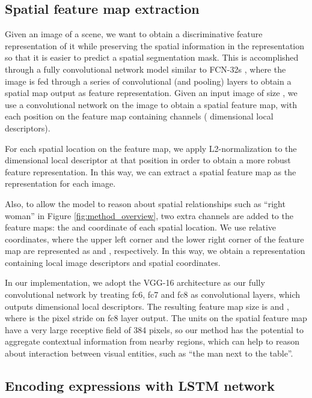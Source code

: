 \documentclass[runningheads]{llncs}
\begin{document}
\subsection{Spatial feature map extraction}\label{sec:encode_image}

Given an image of a scene, we want to obtain a discriminative feature representation of it while preserving the spatial information in the representation so that it is easier to predict a spatial segmentation mask. This is accomplished through a fully convolutional network model similar to FCN-32s \cite{long2015fully}, where the image is fed through a series of convolutional (and pooling) layers to obtain a spatial map output as feature representation. Given an input image of size , we use a convolutional network on the image to obtain a  spatial feature map, with each position on the feature map containing  channels ( dimensional local descriptors).

For each spatial location on the feature map, we apply L2-normalization to the  dimensional local descriptor at that position in order to obtain a more robust feature representation. In this way, we can extract a  spatial feature map as the representation for each image.

Also, to allow the model to reason about spatial relationships such as ``right woman'' in Figure \ref{fig:method_overview}, two extra channels are added to the feature maps: the  and  coordinate of each spatial location. We use relative coordinates, where the upper left corner and the lower right corner of the feature map are represented as  and , respectively. In this way, we obtain a  representation containing local image descriptors and spatial coordinates.

In our implementation, we adopt the VGG-16 architecture \cite{simonyan2014very} as our fully convolutional network by treating fc6, fc7 and fc8 as convolutional layers, which outputs  dimensional local descriptors. The resulting feature map size is  and , where  is the pixel stride on fc8 layer output. The units on the spatial feature map have a very large receptive field of 384 pixels, so our method has the potential to aggregate contextual information from nearby regions, which can help to reason about interaction between visual entities, such as ``the man next to the table''.

\subsection{Encoding expressions with LSTM network}\label{sec:encode_text}
\end{document}
